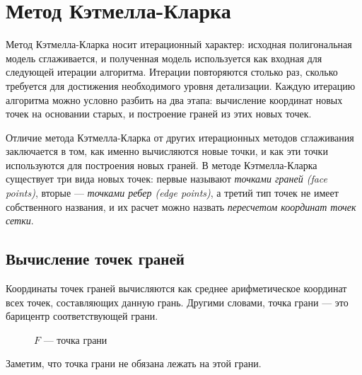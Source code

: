 \documentclass[14pt]{extarticle}
\begin{document}
\newpage
\section{Метод Кэтмелла-Кларка}
Метод Кэтмелла-Кларка носит итерационный характер: исходная полигональная модель сглаживается, и полученная модель используется как входная для следующей итерации алгоритма. Итерации повторяются столько раз, сколько требуется для достижения необходимого уровня детализации. Каждую итерацию алгоритма можно условно разбить на два этапа: вычисление координат новых точек на основании старых, и построение граней из этих новых точек.

Отличие метода Кэтмелла-Кларка от других итерационных методов сглаживания заключается в том, как именно вычисляются новые точки, и как эти точки используются для построения новых граней. В методе Кэтмелла-Кларка существует три вида новых точек: первые называют \emph{точками граней (face points)}, вторые --- \emph{точками ребер (edge points)}, а третий тип точек не имеет собственного названия, и их расчет можно назвать \emph{пересчетом координат точек сетки}.

\subsection{Вычисление точек граней}
Координаты точек граней вычисляются как среднее арифметическое координат всех точек, составляющих данную грань. Другими словами, точка грани --- это барицентр соответствующей грани.

\begin{figure}[H]
  \centering
  \caption{$F$ --- точка грани}
\end{figure}

Заметим, что точка грани не обязана лежать на этой грани.
\end{document}
